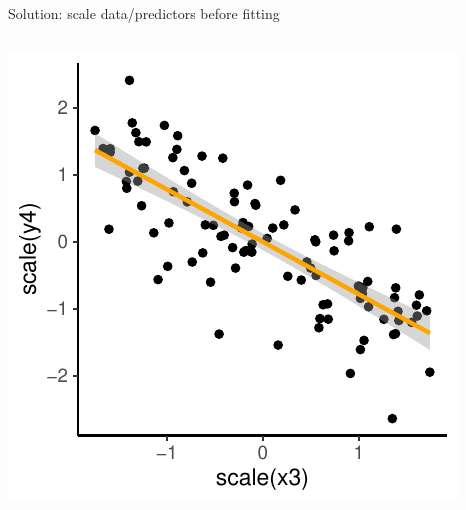 \documentclass[
  ignorenonframetext,
  aspectratio=169]{beamer}
\newenvironment{Shaded}{\begin{snugshade}}{\end{snugshade}}
\newcommand{\AttributeTok}[1]{\textcolor[rgb]{0.13,0.29,0.53}{#1}}
\newcommand{\CommentTok}[1]{\textcolor[rgb]{0.56,0.35,0.01}{\textit{#1}}}
\newcommand{\FunctionTok}[1]{\textcolor[rgb]{0.13,0.29,0.53}{\textbf{#1}}}
\newcommand{\NormalTok}[1]{#1}
\newcommand{\OtherTok}[1]{\textcolor[rgb]{0.56,0.35,0.01}{#1}}
\newcommand{\SpecialCharTok}[1]{\textcolor[rgb]{0.81,0.36,0.00}{\textbf{#1}}}
\let\oldShaded\Shaded %
\let\endoldShaded\endShaded
\renewenvironment{Shaded}{\scriptsize\oldShaded}{\endoldShaded}
\begin{document}
\begin{frame}[fragile]{Solution: scale data/predictors before fitting}
\protect\hypertarget{solution-scale-datapredictors-before-fitting}{}
\begin{columns}[T]
\begin{column}{0.48\textwidth}
\includegraphics{03-Lecture_files/figure-beamer/unnamed-chunk-46-1.pdf}

\small

\begin{Shaded}
\end{Shaded}
\end{column}


\end{columns}
\end{frame}
\end{document}
